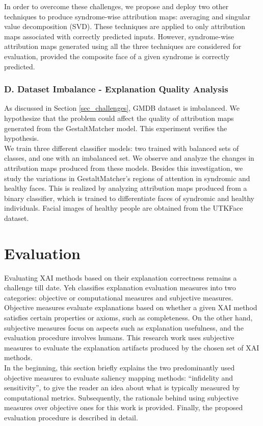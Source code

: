 \documentclass[../report.tex]{subfiles}
\begin{document}
    In order to overcome these challenges, we propose and deploy two other techniques to produce syndrome-wise attribution maps: averaging and singular value decomposition (SVD). These techniques are applied to only attribution maps associated with correctly predicted inputs. However, syndrome-wise attribution maps generated using all the three techniques are considered for evaluation, provided the composite face of a given syndrome is correctly predicted.
    \subsubsection{D. Dataset Imbalance - Explanation Quality Analysis} \label{sec_data_imb}
    As discussed in Section \ref{sec_challenges}, GMDB dataset is imbalanced. We hypothesize that the problem could affect the quality of attribution maps generated from the GestaltMatcher model. This experiment verifies the hypothesis.\\
    We train three different classifier models: two trained with balanced sets of classes, and one with an imbalanced set. We observe and analyze the changes in attribution maps produced from these models. Besides this investigation, we study the variations in GestaltMatcher's regions of attention in syndromic and healthy faces. This is realized by analyzing attribution maps produced from a binary classifier, which is trained to differentiate faces of syndromic and healthy individuals. Facial images of healthy people are obtained from the UTKFace dataset.
    \section{Evaluation}\label{sec_evaluation}
    Evaluating XAI methods based on their explanation correctness remains a challenge till date. Yeh \etal \cite{yeh2019fidelity} classifies explanation evaluation measures into two categories: objective or computational measures and subjective measures. Objective measures evaluate explanations based on whether a given XAI method satisfies certain properties or axioms, such as completeness\cite{sundararajan2017axiomatic}. On the other hand, subjective measures focus on aspects such as explanation usefulness, and the evaluation procedure involves humans. This research work uses subjective measures to evaluate the explanation artifacts produced by the chosen set of XAI methods.\\ 
    In the beginning, this section briefly explains the two predominantly used objective measures to evaluate saliency mapping methods: \enquote{infidelity and sensitivity}\cite{yeh2019fidelity}, to give the reader an idea about what is typically measured by computational metrics. Subsequently, the rationale behind using subjective measures over objective ones for this work is provided. Finally, the proposed evaluation procedure is described in detail.
\end{document}
